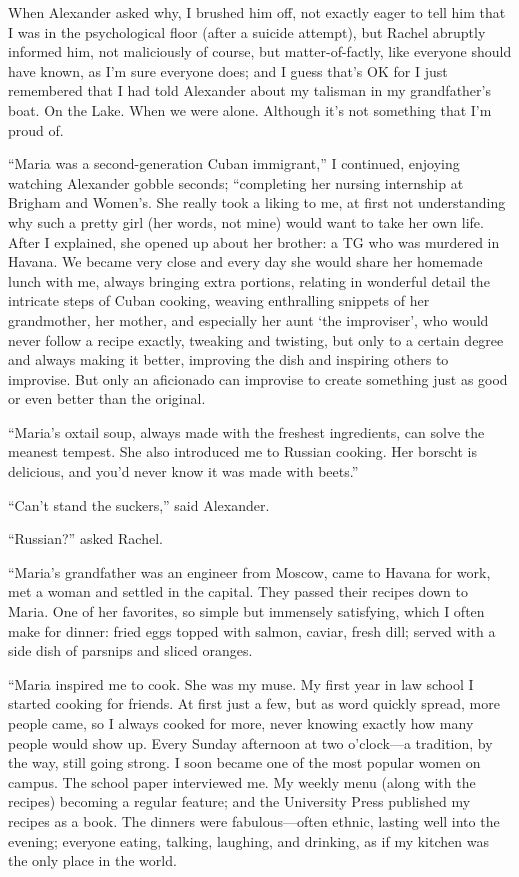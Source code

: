When Alexander asked why, I brushed him off, not exactly eager to tell
him that I was in the psychological floor (after a suicide attempt), but
Rachel abruptly informed him, not maliciously of course, but
matter-of-factly, like everyone should have known, as I'm sure everyone
does; and I guess that's OK for I just remembered that I had told
Alexander about my talisman in my grandfather's boat. On the Lake. When
we were alone. Although it's not something that I'm proud of.

``Maria was a second-generation Cuban immigrant,'' I continued, enjoying
watching Alexander gobble seconds; ``completing her nursing internship at
Brigham and Women's. She really took a liking to me, at first not
understanding why such a pretty girl (her words, not mine) would want to
take her own life. After I explained, she opened up about her brother: a
TG who was murdered in Havana. We became very close and every day she
would share her homemade lunch with me, always bringing extra portions,
relating in wonderful detail the intricate steps of Cuban cooking,
weaving enthralling snippets of her grandmother, her mother, and
especially her aunt `the improviser', who would never follow a recipe
exactly, tweaking and twisting, but only to a certain degree and always
making it better, improving the dish and inspiring others to improvise.
But only an aficionado can improvise to create something just as good or
even better than the original.

``Maria's oxtail soup, always made with the freshest ingredients, can
solve the meanest tempest. She also introduced me to Russian cooking.
Her borscht is delicious, and you'd never know it was made with beets.''

``Can't stand the suckers,'' said Alexander.

``Russian?'' asked Rachel.

``Maria's grandfather was an engineer from Moscow, came to Havana for
work, met a woman and settled in the capital. They passed their recipes
down to Maria. One of her favorites, so simple but immensely satisfying,
which I often make for dinner: fried eggs topped with salmon, caviar,
fresh dill; served with a side dish of parsnips and sliced oranges.

``Maria inspired me to cook. She was my muse. My first year in law
school I started cooking for friends. At first just a few, but as word
quickly spread, more people came, so I always cooked for more, never
knowing exactly how many people would show up. Every Sunday afternoon at
two o'clock---a tradition, by the way, still going strong. I soon became
one of the most popular women on campus. The school paper interviewed
me. My weekly menu (along with the recipes) becoming a regular feature;
and the University Press published my recipes as a book. The dinners
were fabulous---often ethnic, lasting well into the evening; everyone
eating, talking, laughing, and drinking, as if my kitchen was the only
place in the world.

